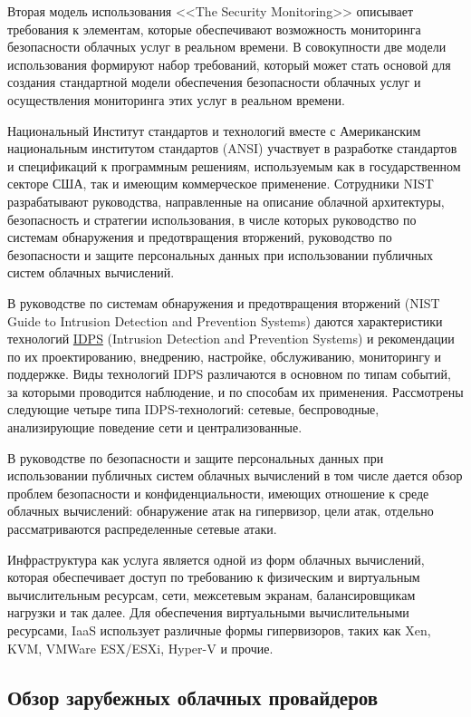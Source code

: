 Вторая модель использования <<The Security Monitoring>> описывает требования к элементам, которые обеспечивают возможность мониторинга безопасности облачных услуг в реальном времени.
В совокупности две модели использования формируют набор требований, который может стать основой для создания стандартной модели обеспечения безопасности облачных услуг и осуществления мониторинга этих услуг в реальном времени.

Национальный Институт стандартов и технологий вместе с Американским национальным институтом стандартов (ANSI) участвует в разработке стандартов и спецификаций к программным решениям, используемым как в государственном секторе США, так и имеющим коммерческое применение.
Сотрудники NIST разрабатывают руководства, направленные на описание облачной архитектуры, безопасность и стратегии использования, в числе которых руководство по системам обнаружения и предотвращения вторжений, руководство по безопасности и защите персональных данных при использовании публичных систем облачных вычислений.

В руководстве по системам обнаружения и предотвращения вторжений (NIST Guide to Intrusion Detection and Prevention Systems) даются характеристики технологий \hyperlink{idps}{IDPS} (Intrusion Detection and Prevention Systems) и рекомендации по их проектированию, внедрению, настройке, обслуживанию, мониторингу и поддержке.
Виды технологий IDPS различаются в основном по типам событий, за которыми проводится наблюдение, и по способам их применения.
Рассмотрены следующие четыре типа IDPS-технологий: сетевые, беспроводные, анализирующие поведение сети и централизованные.

В руководстве по безопасности и защите персональных данных при использовании публичных систем облачных вычислений в том числе дается обзор проблем безопасности и конфиденциальности, имеющих отношение к среде облачных вычислений: обнаружение атак на гипервизор, цели атак, отдельно рассматриваются распределенные сетевые атаки.

Инфраструктура как услуга является одной из форм облачных вычислений, которая обеспечивает доступ по требованию к физическим и виртуальным вычислительным ресурсам, сети, межсетевым экранам, балансировщикам нагрузки и так далее.
Для обеспечения виртуальными вычислительными ресурсами, IaaS использует различные формы гипервизоров, таких как Xen, KVM, VMWare ESX/ESXi, Hyper-V и прочие.

\subsection{Обзор зарубежных облачных провайдеров}

